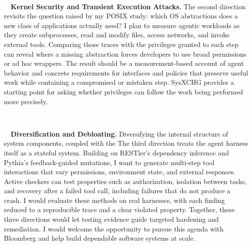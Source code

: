 \documentclass[10pt,letterpaper]{article}
\begin{document}
\
\vspace{-0.75em}

{\noindent~~\textbf{Kernel Security and Transient Execution Attacks.}}
The second direction revisits the question raised by my POSIX study: which OS
abstractions does a new class of applications actually need? I plan to measure
agentic workloads as they create subprocesses, read and modify files, access
networks, and invoke external tools. Comparing those traces with the privileges
granted to each step can reveal where a missing abstraction forces developers
to use broad permissions or ad hoc wrappers. The result should be a
measurement-based account of agent behavior and concrete requirements for
interfaces and policies that preserve useful work while containing a
compromised or mistaken step. SysXCHG provides a starting point for asking
whether privileges can follow the work being performed more precisely.

\
\vspace{-0.75em}

{\noindent~~\textbf{Diversification and Debloating.}}
Diversifying the internal structure of system components, coupled with the
The third direction treats the agent harness itself as a stateful system.
Building on RESTler's dependency inference and Pythia's feedback-guided
mutations, I want to generate multi-step tool interactions that vary
permissions, environment state, and external responses. Active checkers can
test properties such as authorization, isolation between tasks, and recovery
after a failed tool call, including failures that do not produce a crash. I
would evaluate these methods on real harnesses, with each finding reduced to
a reproducible trace and a clear violated property. Together, these three
directions would let testing evidence guide targeted hardening and
remediation. I would welcome the opportunity to pursue this agenda with
Bloomberg and help build dependable software systems at scale.

\renewcommand{\refname}{References}
\small{


}
\end{document}
